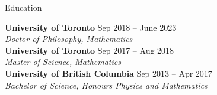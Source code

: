 \documentclass{resume}
\begin{document}
\begin{rSection}{Education}

\textbf{University of Toronto} \hfill {\normalfont Sep 2018 -- June 2023} \\
{\normalfont \textit{Doctor of Philosophy, Mathematics}} \\
\textbf{University of Toronto} \hfill {\normalfont Sep 2017 -- Aug 2018} \\
{\normalfont \textit{Master of Science, Mathematics}} \\
\textbf{University of British Columbia} \hfill {\normalfont Sep 2013 -- Apr 2017}\\
{\normalfont \textit{Bachelor of Science, Honours Physics and Mathematics}}

\end{rSection}

\end{document}
